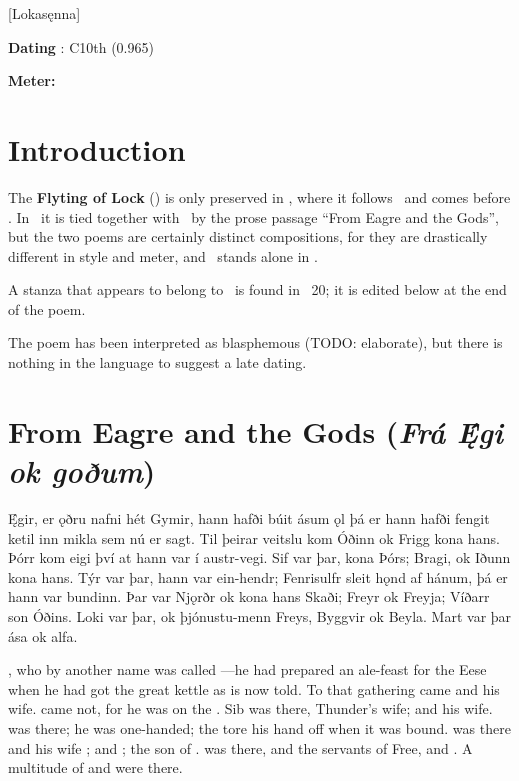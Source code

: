 [Lokasęnna]

\begin{flushright}%
\textbf{Dating} \parencite{Sapp2022}: C10th (0.965)

\textbf{Meter:} \Ljodahattr%
\end{flushright}

\section{Introduction}

{\small The \textbf{Flyting of Lock} (\Lokasenna) is only preserved in \Regius, where it follows \Hymiskvida\ and comes before \Thrymskvida.  In \Regius\ it is tied together with \Hymiskvida\ by the prose passage “From Eagre and the Gods”, but the two poems are certainly distinct compositions, for they are drastically different in style and meter, and \Hymiskvida\ stands alone in \AM.

A stanza that appears to belong to \Lokasenna\ is found in \Gylfaginning\ 20; it is edited below at the end of the poem.

\sectionline

The poem has been interpreted as blasphemous (TODO: elaborate), but there is nothing in the language to suggest a late dating.}

\sectionline

\section{From Eagre and the Gods (\emph{Frá Ę́gi ok goðum})}

\bpg\bpa Ę́gir, er ǫðru nafni hét Gymir, hann hafði búit ásum ǫl þá er hann hafði fengit ketil inn mikla sem nú er sagt. Til þeirar veitslu kom Óðinn ok Frigg kona hans. Þórr kom eigi því at hann var í austr-vegi. Sif var þar, kona Þórs; Bragi, ok Iðunn kona hans. Týr var þar, hann var ein-hendr; Fenrisulfr sleit hǫnd af hánum, þá er hann var bundinn. Þar var Njǫrðr ok kona hans Skaði; Freyr ok Freyja; Víðarr son Óðins. Loki var þar, ok þjónustu-menn Freys, Byggvir ok Beyla. Mart var þar ása ok alfa.\epa

\bpb {}, who by another name was called —he had prepared an ale-feast for the Eese when he had got the great kettle as is now told. To that gathering came  and  his wife.  came not, for he was on the . Sib was there, Thunder’s wife;  and  his wife.  was there; he was one-handed; the  tore his hand off when it was bound.  was there and his wife ;  and ;  the son of .  was there, and the servants of Free,  and . A multitude of  and  were there.\epb\epg


